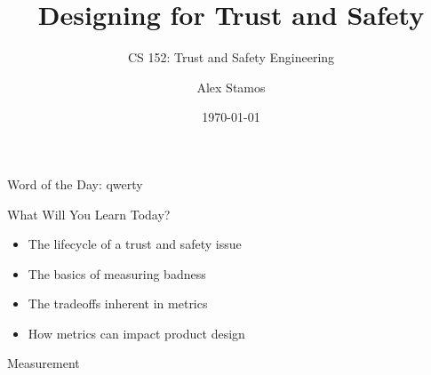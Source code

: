 \documentclass[nobackground,dvipsnames,table]{beamer}
\title{Designing for Trust and Safety}
\subtitle{CS 152: Trust and Safety Engineering}
\author[A. Stamos]{Alex Stamos}
\institute[SIO]{\large Stanford Internet Observatory}
\date[2022]{\today}
\begin{document}
\coverpage

\begin{frame}
    \titlepage
\end{frame}


\begin{frame}{}
    \thispagestyle{empty}
    Word of the Day: qwerty
\end{frame}

\begin{frame}{What Will You Learn Today?}
    \begin{itemize}
        \item The lifecycle of a trust and safety issue
        \item The basics of measuring badness
        \item The tradeoffs inherent in metrics
        \item How metrics can impact product design
    \end{itemize}
\end{frame}

\begin{frame}{}
    \thispagestyle{empty}
    Measurement
\end{frame}
\end{document}
